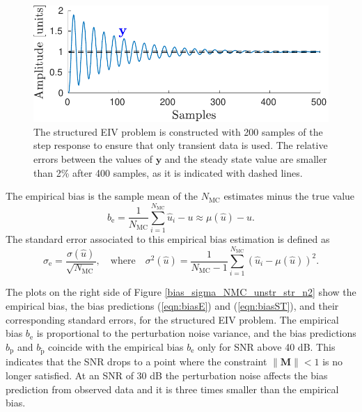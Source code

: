 \begin{figure}[htb!]
\centering
\includegraphics[width=1\columnwidth]{./ChapterStatisticalAnalysis/fig/Fig_5.pdf} 
\caption{ \label{fig:y} The structured EIV problem is constructed with 200 samples of the step response to ensure that only transient data is used. The relative errors between the values of $\mathbf{y}$ and the steady state value are smaller than 2\% after 400 samples, as it is indicated with dashed lines. } 
\end{figure}

The empirical bias is the sample mean of the $N_{\mathrm{MC}}$ estimates minus the true value
 \begin{equation} {b}_\mathrm{e} = \frac{1}{N_{\mathrm{MC}}} \sum_{i=1}^{N_{\mathrm{MC}}}{ \widehat{u}_i - u } \approx \mu \left( \widehat{u} \right) - u. \end{equation}
The standard error associated to this empirical bias estimation \citep{Hammersley75} is defined as 
\begin{equation} \sigma_\mathrm{e} = \frac{\sigma \left( \widehat{u} \right) }{\sqrt{N_{\mathrm{MC}}}}, \quad \mathrm{where} \quad \sigma^2 \left( \widehat{u} \right) = \frac{1}{N_{\mathrm{MC}}-1} \sum_{i=1}^{N_{\mathrm{MC}}}{ \left( { \widehat{u}}_i - \mu \left( \widehat{u} \right) \right)^2 } . \end{equation} 

The plots on the right side of Figure \ref{bias_sigma_NMC_unstr_str_n2} show the empirical bias, the bias predictions (\ref{eqn:biasE}) and (\ref{eqn:biasST}), and their corresponding standard errors, for the structured EIV problem.
The empirical bias $b_\mathrm{e}$ is proportional to the perturbation noise variance, and
the bias predictions $b_\mathrm{p}$ and $b_{\widetilde{\mathrm{p}}}$ coincide with the empirical bias $b_\mathrm{e}$ only for SNR above 40 dB.
This indicates that the SNR drops to a point where the constraint $\| \mathbf{M} \| < 1$ is no longer satisfied.
At an SNR of 30 dB the perturbation noise affects the bias prediction from observed data and it is three times smaller than the empirical bias.


